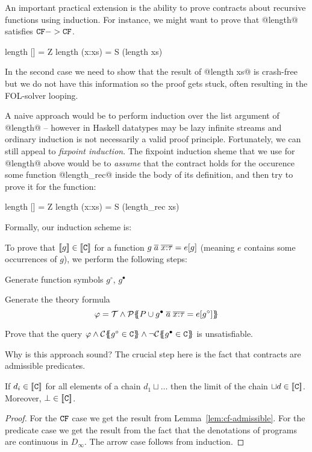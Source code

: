 \label{sect:induction}

An important practical extension is the ability to prove contracts about recursive functions
using induction. For instance, we might want to prove that @length@ satisfies ${\tt CF} -> {\tt CF}$.
\begin{code}
  length []     = Z 
  length (x:xs) = S (length xs)
\end{code}
In the second case we need to show that the result of @length xs@ is crash-free but we do not 
have this information so the proof gets stuck, often resulting in the FOL-solver looping. 

A naive approach would be to perform induction over the list argument of @length@ -- however
in Haskell datatypes may be lazy infinite streams and ordinary induction is not necessarily 
a valid proof principle. Fortunately, we can still appeal to {\em fixpoint induction}. The 
fixpoint induction sheme that we use for @length@ above would be to {\em assume} that the 
contract holds for the occurence some function @length_rec@ inside the body of its definition, 
and then try to prove it for the function:
\begin{code}
  length []     = Z 
  length (x:xs) = S (length_rec xs)
\end{code}

Formally, our induction scheme is:
\begin{definition}\label{def:induction}
To prove that $[\![g]\!] \in [\![{\tt C}]\!]$ for a function 
$g\;\overline{a}\;\overline{x{:}\tau} = e[g]$ (meaning $e$ contains
some occurrences of $g$), we perform the following steps:
\begin{itemize*}
  \item Generate function symbols $g^{\circ}$, $g^{\bullet}$
  \item Generate the theory formula \[ \varphi = {\cal T} \land 
             {\cal P}\{\!\!\{P \cup g^{\bullet}\;\overline{a}\;\overline{x{:}\tau} = e[g^{\circ}]\}\!\!\} \] 
  \item Prove that the query $\phi \land \ctrans{}{}{g^{\circ} \in \Ct} \land \neg \ctrans{}{}{g^{\bullet} \in \Ct}$
        is unsatisfiable.
\end{itemize*}
\end{definition}

Why is this approach sound? The crucial step here is the fact that contracts are admissible predicates.
\begin{theorem}
If $d_i \in [\![{\tt C}]\!]$ for all elements of a chain $d_1 \sqcup \ldots$ then the limit of the chain 
$\sqcup d \in [\![{\tt C}]\!]$. Moreover, $\bot \in [\![{\tt C}]\!]$.
\end{theorem}
\begin{proof}
For the ${\tt CF}$ case we get the result from Lemma~\ref{lem:cf-admissible}. 
For the predicate case we get the result from the fact that the denotations of programs 
are continuous in $D_{\infty}$. The arrow case follows from induction.
\end{proof}

